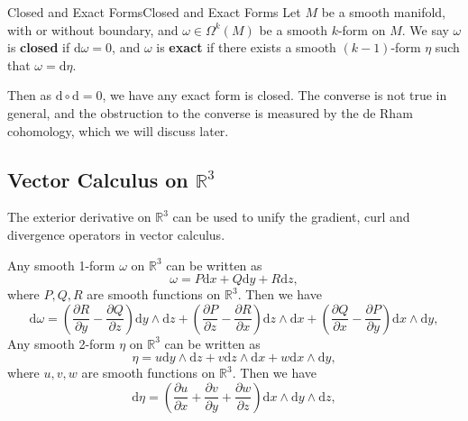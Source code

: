 \documentclass[../main.tex]{subfiles}
\begin{document}
\begin{definition}{Closed and Exact Forms}{Closed and Exact Forms}
  Let $M$ be a smooth manifold, with or without boundary, and $\omega \in \Omega^k(M)$ be a smooth $k$-form on $M$. We say $\omega$ is \textbf{closed} if $\mathrm{d} \omega = 0$, and $\omega$ is \textbf{exact} if there exists a smooth $(k-1)$-form $\eta$ such that $\omega = \mathrm{d} \eta$.
\end{definition}
Then as $\mathrm{d} \circ \mathrm{d} = 0$, we have any exact form is closed. The converse is not true in general, and the obstruction to the converse is measured by the de Rham cohomology, which we will discuss later.

\subsection{Vector Calculus on $\mathbb{R}^3$}
The exterior derivative on $\mathbb{R}^3$ can be used to unify the gradient, curl and divergence operators in vector calculus.

Any smooth 1-form $\omega$ on $\mathbb{R}^3$ can be written as
\begin{equation*}
  \omega = P \mathrm{d} x + Q \mathrm{d} y + R \mathrm{d} z,
\end{equation*}
where $P, Q, R$ are smooth functions on $\mathbb{R}^3$. Then we have
\begin{equation*}
  \mathrm{d} \omega = \left(\frac{\partial R}{\partial y} - \frac{\partial Q}{\partial z}\right) \mathrm{d} y \wedge \mathrm{d} z + \left(\frac{\partial P}{\partial z} - \frac{\partial R}{\partial x}\right) \mathrm{d} z \wedge \mathrm{d} x + \left(\frac{\partial Q}{\partial x} - \frac{\partial P}{\partial y}\right) \mathrm{d} x \wedge \mathrm{d} y,
\end{equation*}
Any smooth 2-form $\eta$ on $\mathbb{R}^3$ can be written as
\begin{equation*}
  \eta = u \mathrm{d} y \wedge \mathrm{d} z + v \mathrm{d} z \wedge \mathrm{d} x + w \mathrm{d} x \wedge \mathrm{d} y,
\end{equation*}
where $u, v, w$ are smooth functions on $\mathbb{R}^3$. Then we have
\begin{equation*}
  \mathrm{d} \eta = \left(\frac{\partial u}{\partial x} + \frac{\partial v}{\partial y} + \frac{\partial w}{\partial z}\right) \mathrm{d} x \wedge \mathrm{d} y \wedge \mathrm{d} z,
\end{equation*}
\end{document}
